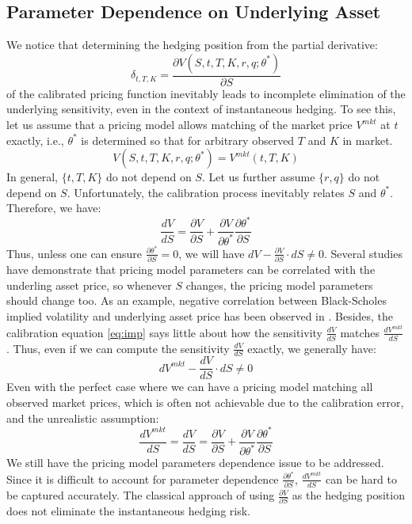 \documentclass[letterpaper,12pt,titlepage,oneside,final]{book}
\numberwithin{equation}{section}
\theoremstyle{definition}
\newcommand{\Vmkt}{V^{mkt}}
\begin{document}
\subsection{Parameter Dependence on Underlying Asset}
\label{sec：dependence}
We notice that determining the hedging position from the partial derivative:
\[
\delta_{t,T,K}=  \frac{\partial V(S,t,T,K,r,q;\theta^*)}{\partial S}
\] of the calibrated pricing function inevitably leads to incomplete elimination of the underlying sensitivity, even in the context of instantaneous hedging. 
To see this,
let us assume that a pricing model allows matching of the market price $\Vmkt$  at $t$ exactly, i.e., $\theta^*$ is determined so that for arbitrary observed $T$ and $K$ in market.
\begin{equation} \label{eq:imp}
     V(S,t,T,K,r,q;\theta^*)=\Vmkt(t,T,K)
\end{equation}
In general, $\{t,T,K\}$ do not depend on $S$. Let us further assume $\{r,q\}$ do not depend on $S$. 
Unfortunately, the calibration process inevitably relates $S$ and $\theta^*$. Therefore, we have:
\[
  \frac{d V}  {d S}=\frac{\partial V}{\partial S} + \frac{\partial V}{\partial \theta^*}\frac{\partial \theta^*}{\partial S}
\]
Thus, unless one can ensure $\frac{\partial \theta^*}{\partial S} = 0$, we will have $dV- \frac{\partial V}{\partial S} \cdot dS \neq 0$.
Several studies have demonstrate that pricing model parameters can be correlated with the underling asset price, so whenever $S$ changes, the pricing model parameters should change too. As an example, negative correlation between Black-Scholes implied volatility and underlying asset price  has been observed  in \cite{french1987expected,bollerslev2006leverage}.
Besides, the calibration equation \eqref{eq:imp} says little about how the sensitivity $\frac{d V}{d S}$ matches $\frac{d \Vmkt}{d S}$. Thus, even if we can compute the sensitivity $\frac{d V}  {d S}$ exactly, we generally have:
\[
    d\Vmkt- \frac{d V}{d S} \cdot dS \neq 0
\]
Even with the perfect case where we can have a pricing model matching all observed market prices, which is often not achievable due to the calibration error, and the unrealistic assumption:
\begin{equation} \label{mkt:d}
    \frac{d \Vmkt}{d S}=\frac{d V}{d S}=\frac{\partial V}{\partial S} + \frac{\partial V}{\partial \theta^*}\frac{\partial \theta^*}{\partial S}
\end{equation}
We still have  the pricing model parameters dependence issue to be addressed. Since it is difficult to account for parameter dependence $\frac{\partial \theta^*}{\partial S}$,  $\frac{d \Vmkt}{d S} $ can be hard to be captured accurately. The classical approach of using $\frac{\partial V}{\partial S}$ as the hedging position does not eliminate the instantaneous hedging risk.
\end{document}
